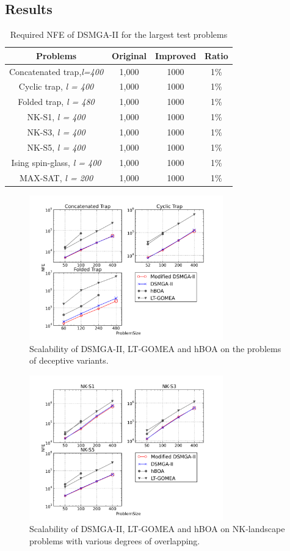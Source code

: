 \documentclass{sig-alternate-05-2015}
\begin{document}
\subsection{Results}


\begin{table}[ht]
\centering
\begin{tabular}{ |c|c|c|c| } \hline
Problems& Original &Improved &Ratio\\ \hline
Concatenated trap,\textit{l=400} 	& 1,000& 1000&1\%\\ \hline
Cyclic trap,\textit{ l = 400} 		& 1,000& 1000&1\%\\ \hline
Folded trap,\textit{ l = 480}	 	& 1,000& 1000&1\%\\ \hline
NK-S1,\textit{ l = 400} 				& 1,000& 1000&1\%\\ \hline
NK-S3,\textit{ l = 400} 				& 1,000& 1000&1\%\\ \hline
NK-S5,\textit{ l = 400} 				& 1,000& 1000&1\%\\ \hline
Ising spin-glass,\textit{ l = 400} 	& 1,000& 1000&1\%\\ \hline
MAX-SAT,\textit{ l = 200} 			& 1,000& 1000&1\%\\ \hline
\end{tabular}
\caption{Required NFE of DSMGA-II for the largest test problems}
\end{table}



\begin{figure}
\centering
\includegraphics[width=3.3in]{trapResults}
\caption{Scalability of DSMGA-II, LT-GOMEA and hBOA on the problems of deceptive variants.}
\end{figure}

\begin{figure}
\centering
\includegraphics[width=3.3in]{nkResults}
\caption{Scalability of DSMGA-II, LT-GOMEA and hBOA on NK-landscape problems with various degrees of overlapping.}
\end{figure}
\end{document}
